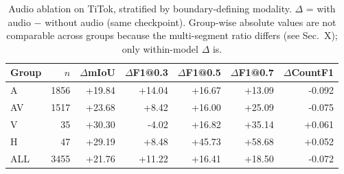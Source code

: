 \begin{table}[t]
\centering\small
\caption{Audio ablation on TiTok, stratified by boundary-defining modality. $\Delta$ = with audio $-$ without audio (same checkpoint). Group-wise absolute values are not comparable across groups because the multi-segment ratio differs (see Sec.~X); only within-model $\Delta$ is.}
\label{tab:audio_ablation_modality}
\begin{tabular}{lrrrrrr}
\toprule
Group & $n$ & $\Delta$mIoU & $\Delta$F1@0.3 & $\Delta$F1@0.5 & $\Delta$F1@0.7 & $\Delta$CountF1 \\
\midrule
A & 1856 & +19.84 & +14.04 & +16.67 & +13.09 & -0.092 \\
AV & 1517 & +23.68 & +8.42 & +16.00 & +25.09 & -0.075 \\
V & 35 & +30.30 & -4.02 & +16.82 & +35.14 & +0.061 \\
H & 47 & +29.19 & +8.48 & +45.73 & +58.68 & +0.052 \\
ALL & 3455 & +21.76 & +11.22 & +16.41 & +18.50 & -0.072 \\
\bottomrule
\end{tabular}
\end{table}
